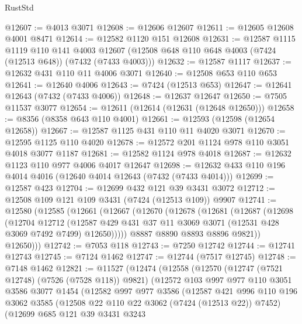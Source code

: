 \begin{lexlean}{RustStd}
\begin{coremodule}
@12607 := @4013 @3071
@12608 := @12606 @12607
@12611 := @12605 @12608 @4001 @8471
@12614 := @12582 @1120 @151 @12608
@12631 := @12587
    @1115
    @1119
    @110
    @141
    @4003
    @12607
    (@12508 @648 @110 @648 @4003 (@7424 (@12513 @648)) (@7432 (@7433 @4003)))
@12632 := @12587 @1117
@12637 := @12632 @431 @110 @11 @4006 @3071
@12640 := @12508 @653 @110 @653
@12641 := @12640 @4006
@12643 := @7424 (@12513 @653)
@12647 := @12641 @12643 (@7432 (@7433 @4006))
@12648 := @12637 @12647
@12650 := @7505 @11537 @3077
@12654 := @12611 (@12614 (@12631 (@12648 @12650)))
@12658 := @8356 (@8358 @643 @110 @4001)
@12661 := @12593 (@12598 (@12654 @12658))
@12667 := @12587 @1125 @431 @110 @11 @4020 @3071
@12670 := @12595 @1125 @110 @4020
@12678 := @12572 @201 @1124 @978 @110 @3051 @4018 @3077 @1187
@12681 := @12582 @1124 @978 @4018
@12687 := @12632 @1123 @110 @977 @4006 @4017 @12647
@12698 := @12632 @433 @110 @196 @4014 @4016 (@12640 @4014 @12643 (@7432 (@7433 @4014)))
@12699 := @12587 @423
@12704 := @12699 @432 @121 @39 @3431 @3072
@12712 := @12508 @109 @121 @109 @3431 (@7424 (@12513 @109)) @9907
@12741 := @12580
    (@12585
      (@12661
        (@12667
          (@12670
            (@12678
              (@12681
                (@12687
                  (@12698
                    (@12704
                      @12712
                      (@12587
                        @429
                        @431
                        @37
                        @11
                        @3069
                        @3071
                        (@12531 @428 @3069 @7492 @7499)
                        @12650)))))
              @8887
              @8890
              @8893
              @8896
              @9821))
          @12650)))
@12742 := @7053 @118
@12743 := @7250 @12742
@12744 := @12741 @12743
@12745 := @7124 @1462
@12747 := @12744 (@7517 @12745)
@12748 := @7148 @1462
@12821 := @11527
    (@12474
      (@12558
        (@12570
          (@12747 (@7521 @12748) (@7526 (@7528 @118)) @9821)
          (@12572
            @103
            @997
            @977
            @110
            @3051
            @3586
            @3077
            @1454
            (@12582
              @997
              @977
              @3586
              (@12587
                @421
                @996
                @110
                @196
                @3062
                @3585
                (@12508 @22 @110 @22 @3062 (@7424 (@12513 @22)) @7452)
                (@12699
                  @685
                  @121
                  @39
                  @3431
                  @3243

\end{coremodule}
\end{lexlean}
